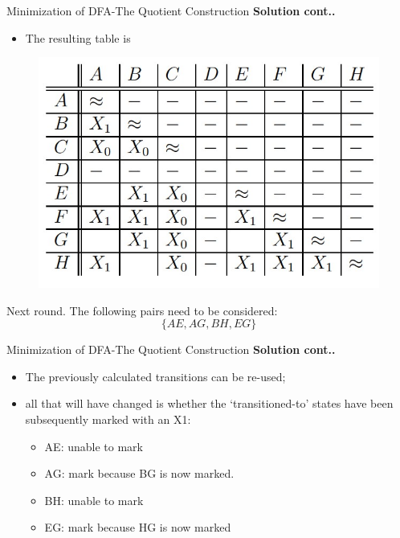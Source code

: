 \documentclass{beamer}
\begin{document}
\begin{frame}{Minimization of DFA-The Quotient Construction}
\textbf{Solution cont..}
\begin{itemize}
	\item The resulting table is
\end{itemize}
	\begin{figure}
	\includegraphics[scale=.4]{img2/m17}
\end{figure}
Next round. The following pairs need to be considered:
$$\{AE, AG, BH, EG\}$$

\end{frame}
\begin{frame}{Minimization of DFA-The Quotient Construction}
	\textbf{Solution cont..}
\begin{itemize}
	\item The previously calculated transitions can be re-used;
	\item all that will have
	changed is whether the ‘transitioned-to’ states have been subsequently
	marked with an X1:
	\begin{itemize}
		\item AE: unable to mark
		\item	AG: mark because BG is now marked.
		\item	BH: unable to mark
		\item	EG: mark because HG is now marked
	\end{itemize}
\end{itemize}
\end{frame}
\end{document}
